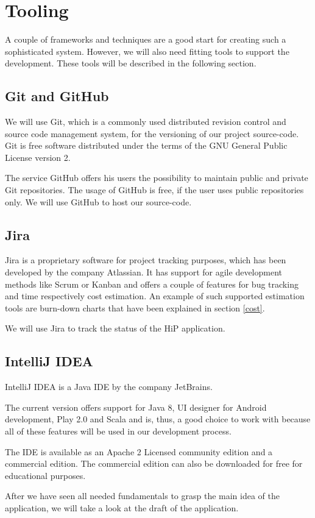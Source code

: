 \section{Tooling}
A couple of frameworks and techniques are a good start for creating such a sophisticated system. However, we will also need fitting tools to support the development. These tools will be described in the following section.

\subsection{Git and GitHub}
We will use Git, which is a commonly used distributed revision control and source code management system, for the versioning of our project source-code. Git is free software distributed under the terms of the GNU General Public License version 2.

The service GitHub offers his users the possibility to maintain public and private Git repositories. The usage of GitHub is free, if the user uses public repositories only. We will use GitHub to host our source-code.

\subsection{Jira}
Jira is a proprietary software for project tracking purposes, which has been developed by the company Atlassian. It has support for agile development methods like Scrum or Kanban and offers a couple of features for bug tracking and time respectively cost estimation. An example of such supported estimation tools are  burn-down charts that have been explained in section \ref{cost}. 

We will use Jira to track the status of the \ac{HiP} application.

\subsection{IntelliJ IDEA}
IntelliJ IDEA is a Java \ac{IDE} by the company JetBrains. 

The current version offers support for Java 8, UI designer for Android development, Play 2.0 and Scala and is, thus, a good choice to work with because all of these features will be used in our development process.

The \ac{IDE} is available as an Apache 2 Licensed community edition and a commercial edition. The commercial edition can also be downloaded for free for educational purposes.

After we have seen all needed fundamentals to grasp the main idea of the application, we will take a look at the draft of the application.